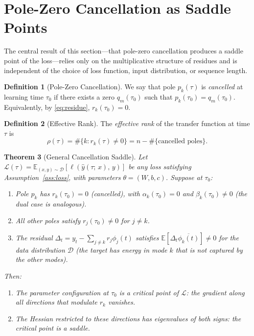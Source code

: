 \documentclass[11pt,a4paper]{article}
\newtheorem{theorem}{Theorem}[section]
\theoremstyle{definition}
\newtheorem{definition}[theorem]{Definition}
\newcommand{\E}{\mathbb{E}}
\newcommand{\cL}{\mathcal{L}}
\newcommand{\cD}{\mathcal{D}}
\begin{document}
\section{Pole-Zero Cancellation as Saddle Points}\label{sec:saddle}

The central result of this section---that pole-zero cancellation
produces a saddle point of the loss---relies only on the
multiplicative structure of residues and is independent of the
choice of loss function, input distribution, or sequence length.

\begin{definition}[Pole-Zero Cancellation]\label{def:cancellation}
We say that pole $p_k(\tau)$ is \emph{cancelled} at learning time
$\tau_0$ if there exists a zero $q_m(\tau_0)$ such that
$p_k(\tau_0) = q_m(\tau_0)$. Equivalently, by
\eqref{eq:residue}, $r_k(\tau_0) = 0$.
\end{definition}

\begin{definition}[Effective Rank]\label{def:eff_rank}
The \emph{effective rank} of the transfer function at time $\tau$ is
\begin{equation}
  \rho(\tau) = \#\{k : r_k(\tau) \neq 0\}
  = n - \#\{\text{cancelled poles}\}.
\end{equation}
\end{definition}

\begin{theorem}[General Cancellation Saddle]\label{thm:saddle}
Let $\cL(\tau) = \E_{(x,y)\sim\cD}[\ell(\hat{y}(\tau;\, x),\, y)]$
be any loss satisfying Assumption~\ref{ass:loss}, with
parameters $\theta = (W, b, c)$. Suppose at $\tau_0$:
\begin{enumerate}[label=(\alph*)]
  \item Pole $p_k$ has $r_k(\tau_0) = 0$ (cancelled), with
    $\alpha_k(\tau_0) = 0$ and $\beta_k(\tau_0) \neq 0$
    (the dual case is analogous).
  \item All other poles satisfy $r_j(\tau_0) \neq 0$ for
    $j \neq k$.
  \item The residual $\Delta_t = y_t - \sum_{j\neq k} r_j\phi_j(t)$
    satisfies $\E[\Delta_t \overline{\phi_k(t)}] \neq 0$ for the
    data distribution $\cD$ (the target has energy in mode $k$
    that is not captured by the other modes).
\end{enumerate}
Then:
\begin{enumerate}[label=(\roman*)]
  \item The parameter configuration at $\tau_0$ is a critical
    point of $\cL$: the gradient along all directions that
    modulate $r_k$ vanishes.
  \item The Hessian restricted to these directions has
    eigenvalues of both signs: the critical point is a saddle.
\end{enumerate}
\end{theorem}
\end{document}
